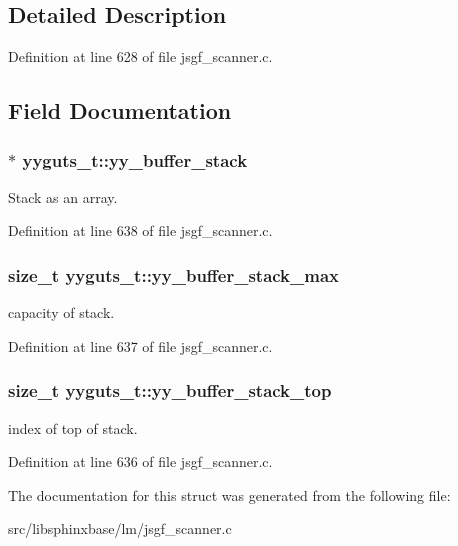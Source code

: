 \subsection{Detailed Description}


Definition at line 628 of file jsgf\+\_\+scanner.\+c.



\subsection{Field Documentation}
\subsubsection[{yy\+\_\+buffer\+\_\+stack}]{$\ast$ yyguts\+\_\+t\+::yy\+\_\+buffer\+\_\+stack}\label{structyyguts__t_ad0b9d576189d518a4482f20ed9b2a416}


Stack as an array. 



Definition at line 638 of file jsgf\+\_\+scanner.\+c.

\subsubsection[{yy\+\_\+buffer\+\_\+stack\+\_\+max}]{\setlength{\rightskip}{0pt plus 5cm}size\+\_\+t yyguts\+\_\+t\+::yy\+\_\+buffer\+\_\+stack\+\_\+max}\label{structyyguts__t_a4435bb91e87f9988b096afc21386289a}


capacity of stack. 



Definition at line 637 of file jsgf\+\_\+scanner.\+c.

\subsubsection[{yy\+\_\+buffer\+\_\+stack\+\_\+top}]{\setlength{\rightskip}{0pt plus 5cm}size\+\_\+t yyguts\+\_\+t\+::yy\+\_\+buffer\+\_\+stack\+\_\+top}\label{structyyguts__t_af92507d904af2fcd4509acde654a9850}


index of top of stack. 



Definition at line 636 of file jsgf\+\_\+scanner.\+c.



The documentation for this struct was generated from the following file\+:\begin{DoxyCompactItemize}
\item 
src/libsphinxbase/lm/jsgf\+\_\+scanner.\+c\end{DoxyCompactItemize}
